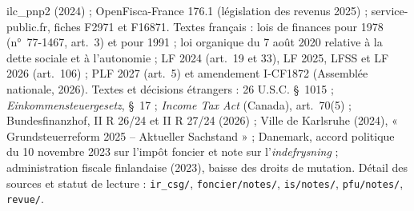 {ilc\_pnp2 (2024) ; OpenFisca-France 176.1 (législation des revenus 2025) ; service-public.fr, fiches F2971 et F16871.
Textes français : lois de finances pour 1978 (n°~77-1467, art.~3) et pour 1991 ; loi organique du 7 août 2020 relative
à la dette sociale et à l'autonomie ; LF 2024 (art.~19 et 33), LF 2025, LFSS et LF 2026 (art.~106) ; PLF 2027 (art.~5) et
amendement I-CF1872 (Assemblée nationale, 2026).
Textes et décisions étrangers : 26 U.S.C. §~1015 ; \emph{Einkommensteuergesetz}, §~17 ; \emph{Income Tax Act} (Canada),
art.~70(5) ; Bundesfinanzhof, II R 26/24 et II R 27/24 (2026) ; Ville de Karlsruhe (2024), « Grundsteuerreform 2025 --
Aktueller Sachstand » ; Danemark, accord politique du 10 novembre 2023 sur l'impôt foncier et note sur
l'\emph{indefrysning} ; administration fiscale finlandaise (2023), baisse des droits de mutation.
Détail des sources et statut de lecture : \texttt{ir\_csg/}, \texttt{foncier/notes/}, \texttt{is/notes/},
\texttt{pfu/notes/}, \texttt{revue/}.\par}
